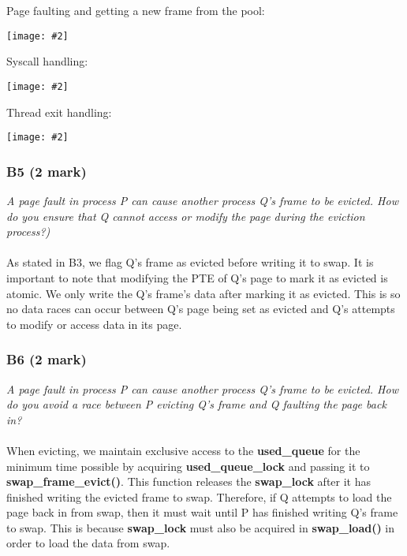 \documentclass{report}
\newcommand{\question}[1]{\textit{#1} \ }
\newcommand{\fun}[1]{\textcolor{Emerald}{\textbf{#1}}}
\newcommand{\var}[1]{\textcolor{RoyalPurple}{\textbf{#1}}}
\newcommand{\centerimage}[2]{\begin{center}
	\texttt{[image: \#2]}
\end{center}}
\begin{document}
					\begin{minipage}{\textwidth}
						Page faulting and getting a new frame from the pool:
						\centerimage{width=\textwidth}{synch page fault.png}
					\end{minipage}

					\begin{minipage}{\textwidth}
						Syscall handling:
						\centerimage{width=\textwidth}{synch syscall.png}
					\end{minipage}

					\begin{minipage}{\textwidth}
						Thread exit handling:
						\centerimage{width=\textwidth}{synch thread exit.png}
					\end{minipage}

				
				
			\subsubsection*{B5 (2 mark)}
				\question{A page fault in process P can cause another process Q's frame to
				be evicted. How do you ensure that Q cannot access or modify the page 
				during the eviction process?)}
				\\
				\\As stated in B3, we flag Q's frame as evicted before writing 
				it to swap. It is important to note that modifying the PTE of 
				Q's page to mark it as evicted is atomic. We only write the Q's
				frame's data after marking it as evicted. This is so no data 
				races can occur between Q's page being set as evicted and Q's 
				attempts to modify or access data in its page.
				
			\subsubsection*{B6 (2 mark)}
				\question{A page fault in process P can cause another process Q's frame
				to be evicted. How do you avoid a race between P evicting Q's frame and 
				Q faulting the page back in?}
				\\
				\\ When evicting, we maintain exclusive access to the 
				\var{used\_queue} for the minimum time possible by acquiring 
				\var{used\_queue\_lock} and passing it to 
				\fun{swap\_frame\_evict()}. This function releases the 
				\var{swap\_lock} after it has finished writing the evicted frame
				to swap. Therefore, if Q attempts to load the page back in 
				from swap, then it must wait until P has finished writing Q's 
				frame to swap. This is because \var{swap\_lock} must also be 
				acquired in \fun{swap\_load()} in order to load the data from 
				swap.
\end{document}
